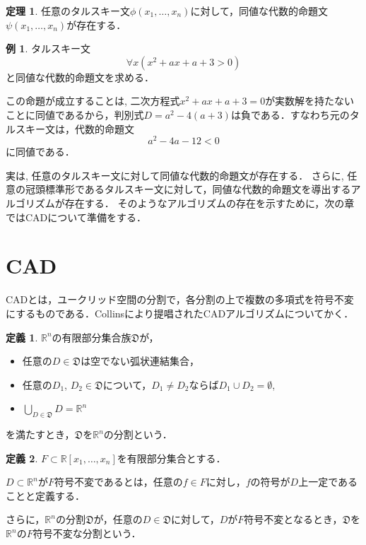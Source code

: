 \documentclass[uplatex, dvipdfmx]{jsarticle}
\newcommand{\R}{\mathbb{R}}
\theoremstyle{definition}
\newtheorem{definition}{定義}[section]
\newtheorem{theorem}{定理}[section]
\newtheorem{example}{例}[section]
\begin{document}
\begin{theorem}
     任意のタルスキー文$\phi(x_1, \dots, x_n)$に対して，同値な代数的命題文$\psi(x_1, \dots, x_n)$が存在する．
\end{theorem}

\begin{example}
     タルスキー文
     \begin{equation*}
          \forall x (x^2 + ax + a + 3 > 0)
     \end{equation*}
     と同値な代数的命題文を求める．

     この命題が成立することは, 二次方程式$x^2 + ax + a + 3 = 0$が実数解を持たないことに同値であるから，判別式$D = a^2 - 4(a+3)$は負である．すなわち元のタルスキー文は，代数的命題文
     \begin{equation*}
          a^2 - 4a - 12 < 0
     \end{equation*}
     に同値である．
\end{example}

実は, 任意のタルスキー文に対して同値な代数的命題文が存在する．
さらに, 任意の冠頭標準形であるタルスキー文に対して，同値な代数的命題文を導出するアルゴリズムが存在する．
そのようなアルゴリズムの存在を示すために，次の章ではCADについて準備をする．


\section{CAD}
CADとは，ユークリッド空間の分割で，各分割の上で複数の多項式を符号不変にするものである．Collinsにより提唱されたCADアルゴリズムについてかく．
\begin{definition}
$\R^n$の有限部分集合族$\mathfrak{D}$が，

\begin{itemize}
	\item 任意の$D \in \mathfrak{D}$は空でない弧状連結集合，
	\item 任意の$D_1$, $D_2 \in \mathfrak{D}$について，$D_1 \neq D_2$ならば$D_1 \cup D_2 = \emptyset$,
	\item $\bigcup_{D \in \mathfrak{D}}D = \R^n$
\end{itemize}

を満たすとき，$\mathfrak{D}$を$\R^n$の分割という．
\end{definition}

\begin{definition}
$F \subset \R[x_1, \dots, x_n]$を有限部分集合とする．

$D \subset \R^n$が$F$符号不変であるとは，任意の$f \in F$に対し，$f$の符号が$D$上一定であることと定義する．

さらに，$\R^n$の分割$\mathfrak{D}$が，任意の$D \in \mathfrak{D}$に対して，$D$が$F$符号不変となるとき，$\mathfrak{D}$を$\R^n$の$F$符号不変な分割という．
\end{definition}
\end{document}
